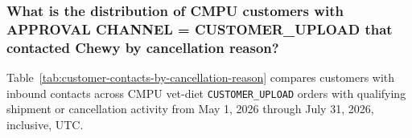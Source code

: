 \subsubsection{What is the distribution of CMPU customers with APPROVAL CHANNEL = CUSTOMER\_UPLOAD that contacted Chewy by cancellation reason?}
Table~\ref{tab:customer-contacts-by-cancellation-reason} compares customers with
inbound contacts across CMPU vet-diet \texttt{CUSTOMER\_UPLOAD} orders with
qualifying shipment or cancellation activity from May 1, 2026 through July 31, 2026, inclusive, UTC.




\clearpage

